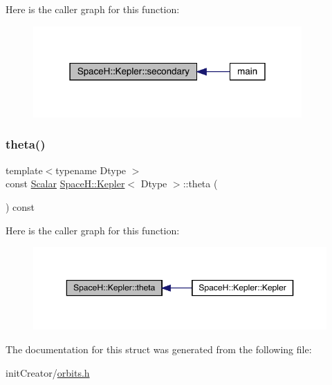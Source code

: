 Here is the caller graph for this function\+:
\nopagebreak
\begin{figure}[H]
\begin{center}
\leavevmode
\includegraphics[width=291pt]{struct_space_h_1_1_kepler_a40fb68cda1662a2ae76e541e2c8fadb8_icgraph}
\end{center}
\end{figure}
\mbox{\label{struct_space_h_1_1_kepler_a54cb1ca091a25449bd298c3dfdd21f6b}} 
\subsubsection{\texorpdfstring{theta()}{theta()}}
{\footnotesize\ttfamily template$<$typename Dtype $>$ \\
const \mbox{\hyperlink{struct_space_h_1_1_kepler_a19291f268209f594a96fb4828fa1a54c}{Scalar}} \mbox{\hyperlink{struct_space_h_1_1_kepler}{Space\+H\+::\+Kepler}}$<$ Dtype $>$\+::theta (\begin{DoxyParamCaption}{ }\end{DoxyParamCaption}) const\hspace{0.3cm}{\ttfamily [inline]}}

Here is the caller graph for this function\+:
\nopagebreak
\begin{figure}[H]
\begin{center}
\leavevmode
\includegraphics[width=350pt]{struct_space_h_1_1_kepler_a54cb1ca091a25449bd298c3dfdd21f6b_icgraph}
\end{center}
\end{figure}


The documentation for this struct was generated from the following file\+:\begin{DoxyCompactItemize}
\item 
init\+Creator/\mbox{\hyperlink{orbits_8h}{orbits.\+h}}\end{DoxyCompactItemize}
